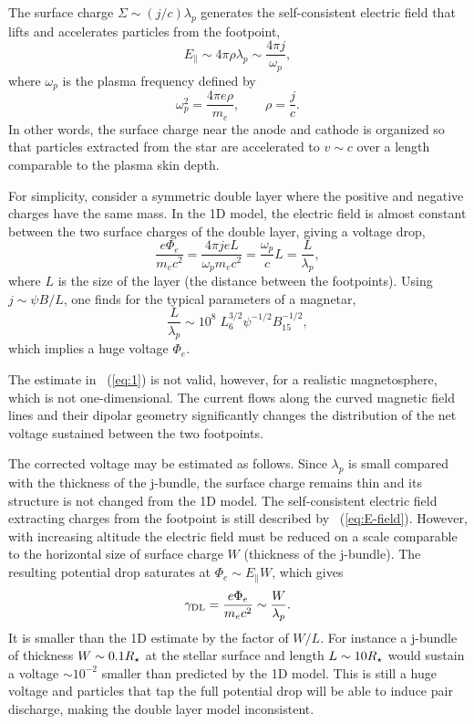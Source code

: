 The surface charge $\Sigma\sim (j/c)\lambda_p$ generates the self-consistent
electric field that lifts and accelerates particles from the footpoint,
\begin{equation}
  \label{eq:E-field}
  E_\parallel\sim 4\pi\rho\lambda_p \sim \frac{4\pi j}{\omega_p},
\end{equation}
where
$\omega_p$ is the plasma frequency defined by
\begin{equation}
\label{eq:omega_p}
  \omega_p^2=\frac{4\pi e\rho}{m_e}, \qquad \rho=\frac{j}{c}.
\end{equation}
In other words, the surface charge near the anode and cathode is organized
so that particles extracted from the star are accelerated to $v\sim c$ over a
length comparable to the plasma skin depth.

For simplicity, consider a symmetric double layer where the positive and
negative charges have the same mass. In the 1D model, the electric field is
almost constant between the two surface charges of the double layer, giving a voltage drop,
\begin{equation}
  \label{eq:double-layer-volt}
  \frac{e\Phi_{e}}{m_{e}c^2} = \frac{4\pi j e L}{\omega_pm_{e}c^{2}} = \frac{\omega_p}{c}L = \frac{L}{\lambda_p},
\end{equation}
where $L$ is the size of the layer (the distance between the footpoints).
Using $j\sim \psi B/L$, one finds for the typical parameters of a magnetar,
\begin{equation}
  \label{eq:1D}
   \frac{L}{\lambda_p} \sim 10^{8}\; L_6^{3/2}\psi^{-1/2} B_{15}^{-1/2},
\end{equation}
which
implies a huge voltage $\Phi_e$.

The estimate in \Eq~(\ref{eq:1}) is not
valid, however, for a realistic
magnetosphere, which is not one-dimensional.
The current flows along the curved magnetic field lines and their dipolar geometry
significantly changes the distribution of
the net voltage
sustained between the two footpoints.

The corrected voltage may be estimated as follows.
Since $\lambda_p$ is small compared with the thickness of the j-bundle,
the surface charge remains thin and its structure is not changed from the 1D model.
The self-consistent electric field extracting charges from the footpoint is still described by
\Eq~(\ref{eq:E-field}). However, with increasing altitude the electric field
must be reduced on a scale comparable to the horizontal size of surface charge
$W$ (thickness of the j-bundle). The resulting potential drop saturates at
$\Phi_e\sim E_\parallel W$, which gives
\begin{equation}
  \label{eq:voltage}
  \gamma_{\rm DL}=\frac{e\Phi_{e}}{m_{e}c^2}
  \sim \frac{W}{\lambda_p}.
\end{equation}
It is smaller than the 1D estimate by the factor of $W/L$. For instance a
j-bundle of thickness $W\sim 0.1R_\star$ at the stellar surface and length $L\sim 10
R_\star$ would sustain a voltage $\sim 10^{-2}$ smaller than predicted by the 1D
model. This is still a huge voltage and particles that tap the full potential
drop will be able to induce pair discharge, making the double layer model
inconsistent.

